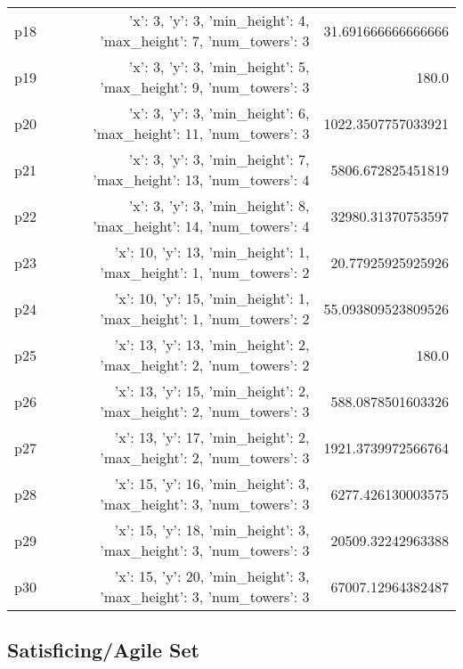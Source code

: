 \documentclass{article}
\begin{document}
\begin{center}
\begin{tabular}{r|r|r}
  p18&{'x': 3, 'y': 3, 'min\_height': 4, 'max\_height': 7, 'num\_towers': 3}&31.691666666666666\\
  p19&{'x': 3, 'y': 3, 'min\_height': 5, 'max\_height': 9, 'num\_towers': 3}&180.0\\
  p20&{'x': 3, 'y': 3, 'min\_height': 6, 'max\_height': 11, 'num\_towers': 3}&1022.3507757033921\\
  p21&{'x': 3, 'y': 3, 'min\_height': 7, 'max\_height': 13, 'num\_towers': 4}&5806.672825451819\\
  p22&{'x': 3, 'y': 3, 'min\_height': 8, 'max\_height': 14, 'num\_towers': 4}&32980.31370753597\\
  p23&{'x': 10, 'y': 13, 'min\_height': 1, 'max\_height': 1, 'num\_towers': 2}&20.77925925925926\\
  p24&{'x': 10, 'y': 15, 'min\_height': 1, 'max\_height': 1, 'num\_towers': 2}&55.093809523809526\\
  p25&{'x': 13, 'y': 13, 'min\_height': 2, 'max\_height': 2, 'num\_towers': 2}&180.0\\
  p26&{'x': 13, 'y': 15, 'min\_height': 2, 'max\_height': 2, 'num\_towers': 3}&588.0878501603326\\
  p27&{'x': 13, 'y': 17, 'min\_height': 2, 'max\_height': 2, 'num\_towers': 3}&1921.3739972566764\\
  p28&{'x': 15, 'y': 16, 'min\_height': 3, 'max\_height': 3, 'num\_towers': 3}&6277.426130003575\\
  p29&{'x': 15, 'y': 18, 'min\_height': 3, 'max\_height': 3, 'num\_towers': 3}&20509.32242963388\\
  p30&{'x': 15, 'y': 20, 'min\_height': 3, 'max\_height': 3, 'num\_towers': 3}&67007.12964382487
                            \end{tabular}
                            \end{center}
                    

                                \subsection*{Satisficing/Agile Set}
                                
\end{document}

